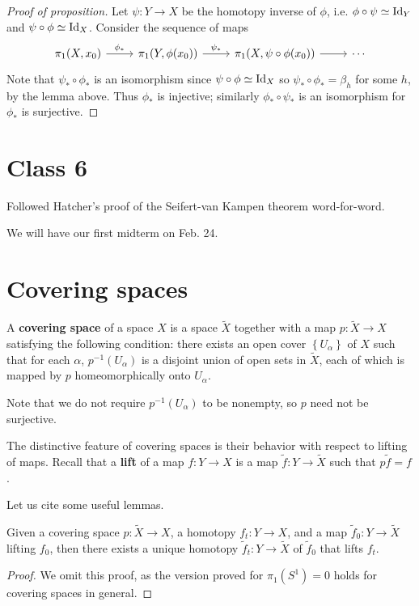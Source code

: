 \documentclass{../mathnotes}
\begin{document}
\begin{proof}[Proof of proposition]
    Let $\psi:Y\to X$ be the homotopy inverse of $\phi$, i.e. $\phi\circ\psi\simeq\operatorname{Id}_Y$ and $\psi\circ\phi\simeq\operatorname{Id}_X$.
    Consider the sequence of maps
    \begin{equation*}
        \begin{tikzcd}
            \pi_1(X,x_0)\arrow{r}{\phi_*}&\pi_1(Y,\phi(x_0))\arrow{r}{\psi_*}&\pi_1(X,\psi\circ\phi(x_0))\arrow{r}&\cdots
        \end{tikzcd}
    \end{equation*}
    Note that $\psi_*\circ\phi_*$ is an isomorphism since $\psi\circ\phi\simeq\operatorname{Id}_X$ so $\psi_*\circ\phi_*=\beta_h$
    for some $h$, by the lemma above. Thus $\phi_*$ is injective; similarly $\phi_*\circ\psi_*$ is an isomorphism
    for $\phi_*$ is surjective.
\end{proof}

\section*{Class 6}

Followed Hatcher's proof of the Seifert-van Kampen theorem word-for-word.
\begin{rem}
    We will have our first midterm on Feb. 24.
\end{rem}


\section*{Covering spaces}

\begin{defn}
    A \textbf{covering space} of a space $X$ is a space $\tilde X$ together with
    a map $p:\tilde X\to X$ satisfying the following condition: there exists an open
    cover $\left\{ U_\alpha \right\}$ of $X$ such that for each $\alpha$, $p^{-1}(U_\alpha)$
    is a disjoint union of open sets in $\tilde X$, each of which is mapped by $p$
    homeomorphically onto $U_\alpha$.
\end{defn}

\begin{rem}
    Note that we do not require $p^{-1}(U_\alpha)$ to be nonempty, so $p$ need not
    be surjective.
\end{rem}

The distinctive feature of covering spaces is their behavior with respect to lifting of maps.
Recall that a \textbf{lift} of a map $f:Y\to X$ is a map $\tilde f:Y\to\tilde X$ such that $p\tilde f=f$.

Let us cite some useful lemmas.

\begin{lem}
    Given a covering space $p:\tilde X\to X$, a homotopy $f_t:Y\to X$, and a
    map $\tilde f_0:Y\to\tilde X$ lifting $f_0$, then there exists a unique homotopy
    $\tilde f_t:Y\to\tilde X$ of $\tilde f_0$ that lifts $f_t$.
\end{lem}
\begin{proof}
    We omit this proof, as the version proved for $\pi_1(S^1)=0$ holds for covering spaces in general.
\end{proof}
\end{document}
